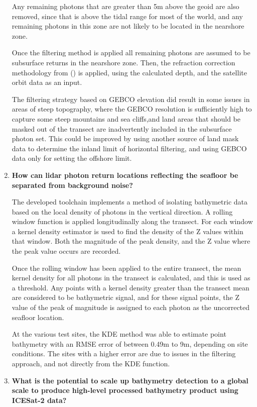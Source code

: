 \begin{enumerate}
    Any remaining photons that are greater than 5m above the geoid are also removed, since that is above the tidal range for most of the world, and any remaining photons in this zone are not likely to be located in the nearshore zone. 

    Once the filtering method is applied all remaining photons are assumed to be subsurface returns in the nearshore zone. Then, the refraction correction methodology from \citeauthor{Parrish2019}(\citeyear{Parrish2019}) is applied, using the calculated depth, and the satellite orbit data as an input. 

    The filtering strategy based on GEBCO elevation did result in some issues in areas of steep topography, where the GEBCO resolution is sufficiently high to capture some steep mountains and sea cliffs,and land areas that should be masked out of the transect are inadvertently included in the subsurface photon set. This could be improved by using another source of land mask data to determine the inland limit of horizontal filtering, and using GEBCO data only for setting the offshore limit.

    \item \textbf{How can lidar photon return locations reflecting the seafloor be separated from background noise?}
    
    The developed toolchain implements a method of isolating bathymetric data based on the local density of photons in the vertical direction. A rolling window function is applied longitudinally along the transect. For each window a kernel density estimator is used to find the density of the Z values within that window. Both the magnitude of the peak density, and the Z value where the peak value occurs are recorded.    
    
    Once the rolling window has been applied to the entire transect, the mean kernel density for all photons in the transect is calculated, and this is used as a threshold. Any points with a kernel density greater than the transect mean are considered to be bathymetric signal, and for these signal points, the Z value of the peak of magnitude is assigned to each photon as the uncorrected seafloor location. 
    
    At the various test sites, the KDE method was able to estimate point bathymetry with an RMSE error of between 0.49m to 9m, depending on site conditions. The sites with a higher error are due to issues in the filtering approach, and not directly from the KDE function.
    \item \textbf{What is the potential to scale up bathymetry detection to a global scale to produce high-level processed bathymetry product using ICESat-2 data? } 
    

\end{enumerate}
